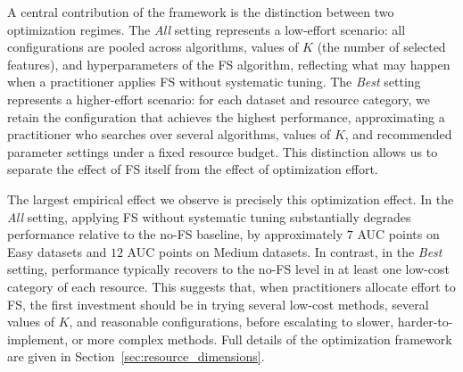 \documentclass[preprint,12pt,authoryear]{elsarticle}
\begin{document}
\begin{table}[t]
\centering
\footnotesize
\caption{Distribution of the 37 feature selection algorithms across resource dimensions. Each row corresponds to a resource, and columns (C1--C5) denote its categories.}
\label{tab:fs_resource_summary}

\end{table}

A central contribution of the framework is the distinction between two optimization regimes. The \emph{All} setting represents a low-effort scenario: all configurations are pooled across algorithms, values of $K$ (the number of selected features), and hyperparameters of the FS algorithm, reflecting what may happen when a practitioner applies FS without systematic tuning. The \emph{Best} setting represents a higher-effort scenario: for each dataset and resource category, we retain the configuration that achieves the highest performance, approximating a practitioner who searches over several algorithms, values of $K$, and recommended parameter settings under a fixed resource budget. This distinction allows us to separate the effect of FS itself from the effect of optimization effort.

The largest empirical effect we observe is precisely this optimization effect. In the \emph{All} setting, applying FS without systematic tuning substantially degrades performance relative to the no-FS baseline, by approximately $7$ AUC points on Easy datasets and $12$ AUC points on Medium datasets. In contrast, in the \emph{Best} setting, performance typically recovers to the no-FS level in at least one low-cost category of each resource. This suggests that, when practitioners allocate effort to FS, the first investment should be in trying several low-cost methods, several values of $K$, and reasonable configurations, before escalating to slower, harder-to-implement, or more complex methods. Full details of the optimization framework are given in Section~\ref{sec:resource_dimensions}.
\end{document}
